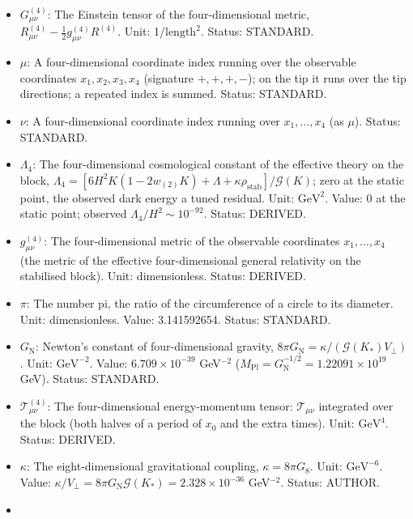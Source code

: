 \documentclass[
  10pt,
]{article}
\providecommand{\tightlist}{%
  \setlength{\itemsep}{0pt}\setlength{\parskip}{0pt}}
\begin{document}
\begin{itemize}
\tightlist
\item
  \(G^{(4)}_{\mu\nu}\): The Einstein tensor of the four-dimensional
  metric, \(R^{(4)}_{\mu\nu} - \frac12 g^{(4)}_{\mu\nu}R^{(4)}\). Unit:
  1/\(\mathrm{length}^{2}\). Status: STANDARD.
\item
  \(\mu\): A four-dimensional coordinate index running over the
  observable coordinates \(x_1, x_2, x_3, x_4\) (signature \(+,+,+,-\));
  on the tip it runs over the tip directions; a repeated index is
  summed. Status: STANDARD.
\item
  \(\nu\): A four-dimensional coordinate index running over
  \(x_1, \dots, x_4\) (as \(\mu\)). Status: STANDARD.
\item
  \(\Lambda_4\): The four-dimensional cosmological constant of the
  effective theory on the block,
  \(\Lambda_4 = [6H^2K(1 - 2w_{(2)}K) + \Lambda + \kappa\rho_{\mathrm{stab}}]/\mathcal{G}(K)\);
  zero at the static point, the observed dark energy a tuned residual.
  Unit: \(\mathrm{GeV}^{2}\). Value: 0 at the static point; observed
  \(\Lambda_4/H^2 \sim 10^{-92}\). Status: DERIVED.
\item
  \(g^{(4)}_{\mu\nu}\): The four-dimensional metric of the observable
  coordinates \(x_1, \dots, x_4\) (the metric of the effective
  four-dimensional general relativity on the stabilised block). Unit:
  dimensionless. Status: DERIVED.
\item
  \(\pi\): The number pi, the ratio of the circumference of a circle to
  its diameter. Unit: dimensionless. Value: 3.141592654. Status:
  STANDARD.
\item
  \(G_{\mathrm{N}}\): Newton's constant of four-dimensional gravity,
  \(8\pi G_{\mathrm{N}} = \kappa/(\mathcal{G}(K_*)V_\perp)\). Unit:
  \(\mathrm{GeV}^{-2}\). Value: \(6.709\times10^{-39}\) GeV\(^{-2}\)
  (\(M_{\mathrm{Pl}} = G_{\mathrm{N}}^{-1/2} = 1.22091\times10^{19}\)
  GeV). Status: STANDARD.
\item
  \(\mathcal{T}^{(4)}_{\mu\nu}\): The four-dimensional energy-momentum
  tensor: \(\mathcal{T}_{\mu\nu}\) integrated over the block (both
  halves of a period of \(x_0\) and the extra times). Unit:
  \(\mathrm{GeV}^{4}\). Status: DERIVED.
\item
  \(\kappa\): The eight-dimensional gravitational coupling,
  \(\kappa = 8\pi G_8\). Unit: \(\mathrm{GeV}^{-6}\). Value:
  \(\kappa/V_\perp = 8\pi G_{\mathrm{N}}\mathcal{G}(K_*) = 2.328\times10^{-36}\)
  GeV\(^{-2}\). Status: AUTHOR.
\item

\end{itemize}
\end{document}
